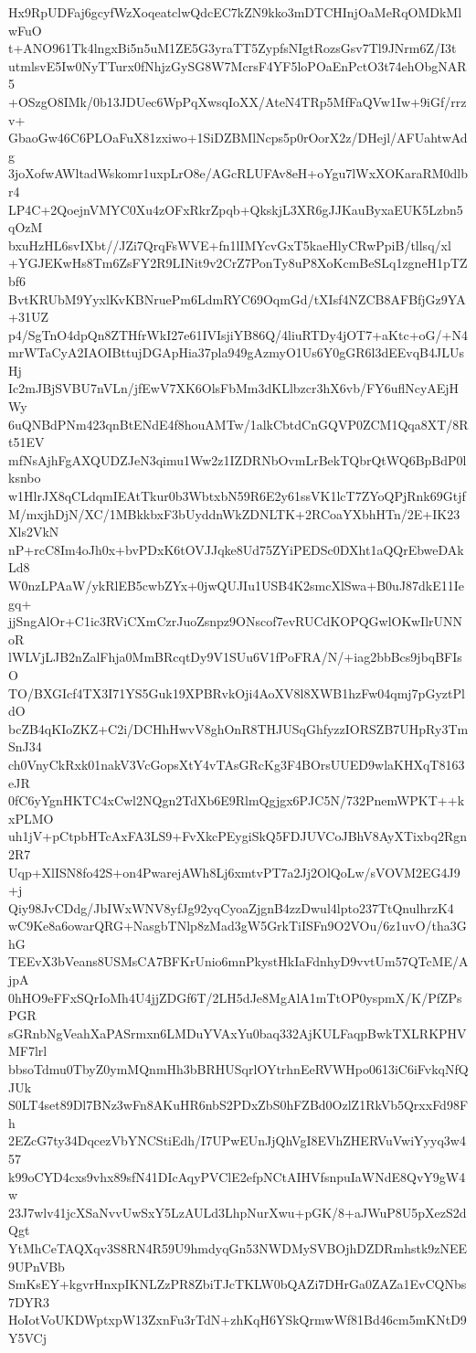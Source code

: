 Hx9RpUDFaj6gcyfWzXoqeatclwQdcEC7kZN9kko3mDTCHInjOaMeRqOMDkMlwFuO
t+ANO961Tk4lngxBi5n5uM1ZE5G3yraTT5ZypfsNIgtRozsGsv7Tl9JNrm6Z/I3t
utmlsvE5Iw0NyTTurx0fNhjzGySG8W7McrsF4YF5loPOaEnPctO3t74ehObgNAR5
+OSzgO8IMk/0b13JDUec6WpPqXwsqIoXX/AteN4TRp5MfFaQVw1Iw+9iGf/rrzv+
GbaoGw46C6PLOaFuX81zxiwo+1SiDZBMlNcps5p0rOorX2z/DHejl/AFUahtwAdg
3joXofwAWltadWskomr1uxpLrO8e/AGcRLUFAv8eH+oYgu7lWxXOKaraRM0dlbr4
LP4C+2QoejnVMYC0Xu4zOFxRkrZpqb+QkskjL3XR6gJJKauByxaEUK5Lzbn5qOzM
bxuHzHL6svIXbt//JZi7QrqFsWVE+fn1lIMYcvGxT5kaeHlyCRwPpiB/tllsq/xl
+YGJEKwHs8Tm6ZsFY2R9LINit9v2CrZ7PonTy8uP8XoKcmBeSLq1zgneH1pTZbf6
BvtKRUbM9YyxlKvKBNruePm6LdmRYC69OqmGd/tXIsf4NZCB8AFBfjGz9YA+31UZ
p4/SgTnO4dpQn8ZTHfrWkI27e61IVIsjiYB86Q/4liuRTDy4jOT7+aKtc+oG/+N4
mrWTaCyA2IAOIBttujDGApHia37pla949gAzmyO1Us6Y0gGR6l3dEEvqB4JLUsHj
Ic2mJBjSVBU7nVLn/jfEwV7XK6OlsFbMm3dKLlbzcr3hX6vb/FY6uflNcyAEjHWy
6uQNBdPNm423qnBtENdE4f8houAMTw/1alkCbtdCnGQVP0ZCM1Qqa8XT/8Rt51EV
mfNsAjhFgAXQUDZJeN3qimu1Ww2z1IZDRNbOvmLrBekTQbrQtWQ6BpBdP0lksnbo
w1HlrJX8qCLdqmIEAtTkur0b3WbtxbN59R6E2y61ssVK1lcT7ZYoQPjRnk69Gtjf
M/mxjhDjN/XC/1MBkkbxF3bUyddnWkZDNLTK+2RCoaYXbhHTn/2E+IK23Xls2VkN
nP+rcC8Im4oJh0x+bvPDxK6tOVJJqke8Ud75ZYiPEDSc0DXht1aQQrEbweDAkLd8
W0nzLPAaW/ykRlEB5cwbZYx+0jwQUJIu1USB4K2smcXlSwa+B0uJ87dkE11Iegq+
jjSngAlOr+C1ic3RViCXmCzrJuoZsnpz9ONscof7evRUCdKOPQGwlOKwIlrUNNoR
lWLVjLJB2nZalFhja0MmBRcqtDy9V1SUu6V1fPoFRA/N/+iag2bbBcs9jbqBFIsO
TO/BXGIcf4TX3I71YS5Guk19XPBRvkOji4AoXV8l8XWB1hzFw04qmj7pGyztPldO
bcZB4qKIoZKZ+C2i/DCHhHwvV8ghOnR8THJUSqGhfyzzIORSZB7UHpRy3TmSnJ34
ch0VnyCkRxk01nakV3VcGopsXtY4vTAsGRcKg3F4BOrsUUED9wlaKHXqT8163eJR
0fC6yYgnHKTC4xCwl2NQgn2TdXb6E9RlmQgjgx6PJC5N/732PnemWPKT++kxPLMO
uh1jV+pCtpbHTcAxFA3LS9+FvXkcPEygiSkQ5FDJUVCoJBhV8AyXTixbq2Rgn2R7
Uqp+XlISN8fo42S+on4PwarejAWh8Lj6xmtvPT7a2Jj2OlQoLw/sVOVM2EG4J9+j
Qiy98JvCDdg/JbIWxWNV8yfJg92yqCyoaZjgnB4zzDwul4lpto237TtQnulhrzK4
wC9Ke8a6owarQRG+NasgbTNlp8zMad3gW5GrkTiISFn9O2VOu/6z1uvO/tha3GhG
TEEvX3bVeans8USMsCA7BFKrUnio6mnPkystHkIaFdnhyD9vvtUm57QTcME/AjpA
0hHO9eFFxSQrIoMh4U4jjZDGf6T/2LH5dJe8MgAlA1mTtOP0yspmX/K/PfZPsPGR
sGRnbNgVeahXaPASrmxn6LMDuYVAxYu0baq332AjKULFaqpBwkTXLRKPHVMF7lrl
bbsoTdmu0TbyZ0ymMQnmHh3bBRHUSqrlOYtrhnEeRVWHpo0613iC6iFvkqNfQJUk
S0LT4set89Dl7BNz3wFn8AKuHR6nbS2PDxZbS0hFZBd0OzlZ1RkVb5QrxxFd98Fh
2EZcG7ty34DqcezVbYNCStiEdh/I7UPwEUnJjQhVgI8EVhZHERVuVwiYyyq3w457
k99oCYD4cxs9vhx89sfN41DIcAqyPVClE2efpNCtAIHVfsnpuIaWNdE8QvY9gW4w
23J7wlv41jcXSaNvvUwSxY5LzAULd3LhpNurXwu+pGK/8+aJWuP8U5pXezS2dQgt
YtMhCeTAQXqv3S8RN4R59U9hmdyqGn53NWDMySVBOjhDZDRmhstk9zNEE9UPnVBb
SmKsEY+kgvrHnxpIKNLZzPR8ZbiTJcTKLW0bQAZi7DHrGa0ZAZa1EvCQNbs7DYR3
HoIotVoUKDWptxpW13ZxnFu3rTdN+zhKqH6YSkQrmwWf81Bd46cm5mKNtD9Y5VCj
